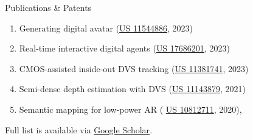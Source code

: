 \documentclass[
	10pt, %
]{resume} %
\begin{document}
\begin{rSection}{Publications \& Patents}
\begin{enumerate}
\item  Generating digital avatar (\href{https://patents.google.com/patent/US11544886B2}{US 11544886}, 2023)
\item Real-time interactive digital agents (\href{https://patents.google.com/patent/US20230281466A1/en} {US  17686201}, 2023) 
\item CMOS-assisted inside-out DVS tracking (\href{https://patents.google.com/patent/US11381741B2}{US 11381741}, 2023)
\item Semi-dense depth estimation with DVS (\href{https://patentimages.storage.googleapis.com/77/86/a3/d3c88f2dff2b7d/US11143879.pdf} {US 11143879}, 2021)
\item Semantic mapping for low-power AR ( \href{https://patentimages.storage.googleapis.com/af/72/51/59c6812bbb8e7d/US10812711.pdf} {US 10812711}, 2020), 
\end{enumerate}

Full list is available via \href{https://scholar.google.com/citations?user=C4QRs3AAAAAJ&hl=en&oi=ao}{Google Scholar}.

\end{rSection}
\end{document}

